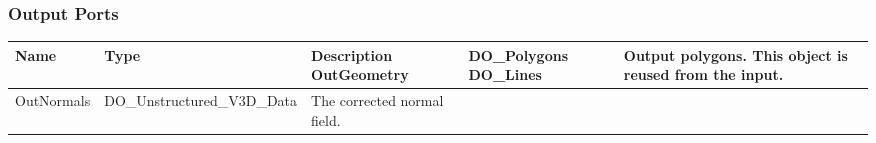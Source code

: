 \begin{htmlonly}
\begin{longtable}{|p{2.5cm}|p{4.5cm}|p{7cm}|}
                    
														

\hline
\end{longtable}



%
\subsubsection{Output Ports}
%

 
\begin{longtable}{|p{2.5cm}|p{4.5cm}|p{7cm}|}
\hline
   \bf{Name} & \bf{Type} & \bf{Description} \endhead
\hline\hline
	\textcolor{required}{OutGeometry} & DO\_Polygons  DO\_Lines& 
                    Output polygons. This object is reused from
                    the input.\\
\hline
	\textcolor{required}{OutNormals} & DO\_Unstructured\_V3D\_Data& 
                    The corrected normal field.\\

\hline
\end{longtable}



\end{htmlonly}
